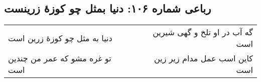 \begin{center}
\section*{رباعی شماره ۱۰۶: دنیا بمثل چو کوزهٔ زرینست}
\label{sec:sh106}
\begin{longtable}{l p{0.5cm} r}
دنیا به مثل چو کوزهٔ زرین است
&&
گه آب در او تلخ و گهی شیرین است
\\
تو غره مشو که عمر من چندین است
&&
کاین اسب عمل مدام زیر زین است
\\
\end{longtable}
\end{center}
